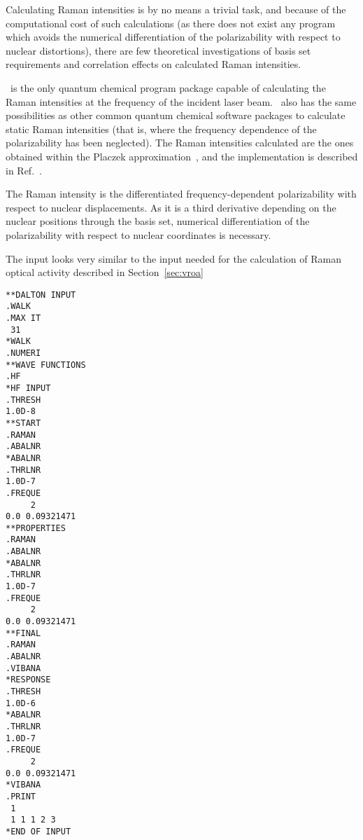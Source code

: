 \begin{center}
\end{center}

 Calculating Raman intensities is by no means
a trivial task, and
because of the computational cost of such calculations (as there does
not exist any program which avoids the numerical differentiation of the
polarizability with respect to nuclear distortions), there are
few theoretical investigations of basis set requirements and
correlation effects on calculated Raman intensities.

\siraba\ is the only quantum chemical program package capable of
calculating the Raman intensities at the frequency of the incident
laser beam. \siraba\ also has the same possibilities as other
common quantum chemical software packages to calculate static
Raman intensities (that is, where the frequency dependence of the
polarizability has been neglected). The Raman intensities calculated
are the ones obtained within the Placzek
approximation~\cite{placzek},
and the implementation is described in Ref.~\cite{thkrklbpjjofd99}.

The Raman intensity is the differentiated frequency-dependent
polarizability with respect to nuclear displacements.
As it is a third derivative depending on the nuclear positions through
the basis set, numerical differentiation of
the polarizability with respect to nuclear coordinates is
necessary.

The input looks very similar to the input needed for the calculation
of Raman optical activity  described
in Section~\ref{sec:vroa}

\begin{verbatim}
**DALTON INPUT
.WALK
.MAX IT
 31
*WALK
.NUMERI
**WAVE FUNCTIONS
.HF
*HF INPUT
.THRESH
1.0D-8
**START
.RAMAN
.ABALNR
*ABALNR
.THRLNR
1.0D-7
.FREQUE
     2
0.0 0.09321471
**PROPERTIES
.RAMAN
.ABALNR
*ABALNR
.THRLNR
1.0D-7
.FREQUE
     2
0.0 0.09321471
**FINAL
.RAMAN
.ABALNR
.VIBANA
*RESPONSE
.THRESH
1.0D-6
*ABALNR
.THRLNR
1.0D-7
.FREQUE
     2
0.0 0.09321471
*VIBANA
.PRINT
 1
 1 1 1 2 3
*END OF INPUT
\end{verbatim}

